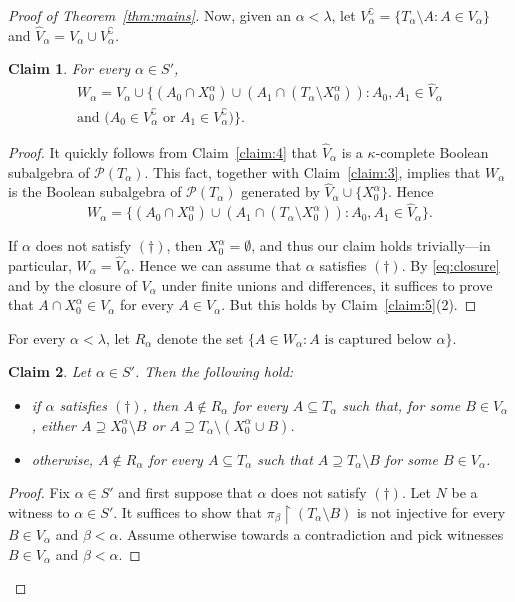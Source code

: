 \documentclass[]{amsart}
\newtheorem{claim}{Claim}[theorem]
\theoremstyle{definition}
\theoremstyle{remark}
\begin{document}
\begin{proof}[Proof of Theorem~\ref{thm:mains}]
Now, given an $\alpha < \lambda$, let $V^{\complement}_\alpha = \{T_\alpha \setminus A : A \in V_\alpha\}$ and $\hat{V}_\alpha = V_\alpha \cup V_\alpha^\complement$.

\begin{claim}\label{claim:6}
For every $\alpha \in S'$, 
\begin{multline*}
W_\alpha = V_\alpha \cup \big\{(A_0 \cap X^\alpha_0) \cup (A_1 \cap (T_\alpha \setminus X^\alpha_0)) : A_0, A_1 \in \hat{V}_\alpha\\ \text{and } \big(A_0 \in V_\alpha^\complement \text{ or } A_1 \in V_\alpha^\complement\big)\big\}.
\end{multline*}
\end{claim}
\begin{proof}

It quickly follows from Claim~\ref{claim:4} that $\hat{V}_\alpha$ is a $\kappa$-complete Boolean subalgebra of $\mathcal{P}(T_\alpha)$. This fact, together with Claim~\ref{claim:3}, implies that $W_\alpha$ is the Boolean subalgebra of $\mathcal{P}(T_\alpha)$ generated by $\hat{V}_\alpha \cup \{X^\alpha_0\}$. Hence
\begin{equation}\label{eq:closure}
W_\alpha = \{(A_0 \cap X^\alpha_0) \cup (A_1 \cap (T_\alpha \setminus X^\alpha_0)): A_0, A_1 \in \hat{V}_\alpha\}.
\end{equation}

If $\alpha$ does not satisfy $(\dagger)$, then $X^\alpha_0 = \emptyset$, and thus our claim holds trivially---in particular, $W_\alpha = \hat{V}_\alpha$. Hence we can assume that $\alpha$ satisfies $(\dagger)$. By \eqref{eq:closure} and by the closure of $V_\alpha$ under finite unions and differences, it suffices to prove that $A \cap X^\alpha_0 \in V_\alpha$ for every $A \in V_\alpha$. But this holds by Claim~\ref{claim:5}(2).
\end{proof}

For every $\alpha < \lambda$, let $R_\alpha$ denote the set $\{A \in W_\alpha : A \text{ is captured below } \alpha\}$.

\begin{claim}\label{claim:7}
Let $\alpha \in S'$. Then the following hold:
\begin{itemize}
\item if $\alpha$ satisfies $(\dagger)$, then $A \not\in R_\alpha$ for every $A \subseteq T_\alpha$ such that, for some $B \in V_\alpha$, either $A \supseteq X^\alpha_0 \setminus B$ or $A \supseteq T_\alpha \setminus (X^\alpha_0 \cup B)$.
\item otherwise, $A \not\in R_\alpha$ for every $A \subseteq T_\alpha$ such that $A \supseteq T_\alpha \setminus B$ for some $B \in V_\alpha$.
\end{itemize}
\end{claim}
\begin{proof}
Fix $\alpha \in S'$ and first suppose that $\alpha$ does not satisfy $(\dagger)$. Let $N$ be a witness to $\alpha \in S'$. It suffices to show that $\pi_\beta \upharpoonright (T_\alpha \setminus B)$ is not injective for every $B \in V_\alpha$ and $\beta < \alpha$. Assume otherwise towards a contradiction and pick witnesses $B \in V_\alpha$ and $\beta < \alpha$.  


\end{proof}
\end{proof}
\end{document}
